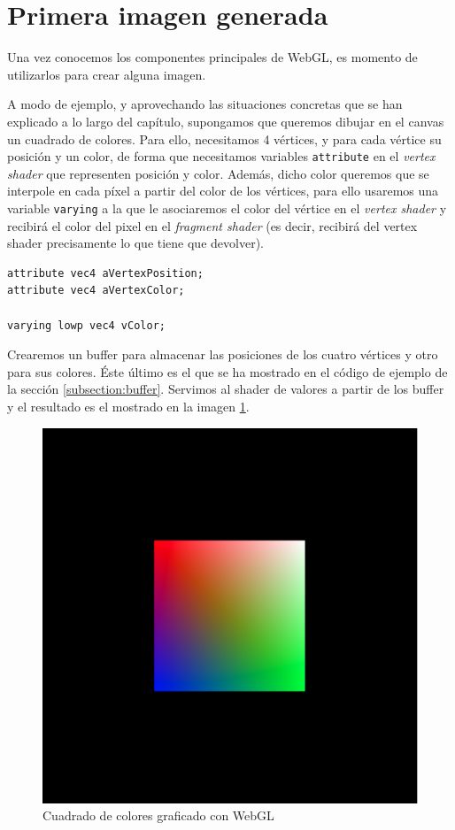 \section{Primera imagen generada}

Una vez conocemos los componentes principales de WebGL, es momento de utilizarlos para crear alguna imagen.

A modo de ejemplo, y aprovechando las situaciones concretas que se han explicado a lo largo del capítulo, supongamos que queremos dibujar en el canvas un cuadrado de colores. Para ello, necesitamos 4 vértices, y para cada vértice su posición y un color, de forma que necesitamos variables \verb|attribute| en el \textit{vertex shader} que representen posición y color. Además, dicho color queremos que se interpole en cada píxel a partir del color de los vértices, para ello usaremos una variable \verb|varying| a la que le asociaremos el color del vértice en el \textit{vertex shader} y recibirá el color del pixel en el \textit{fragment shader} (es decir, recibirá del vertex shader precisamente lo que tiene que devolver).
\begin{lstlisting}
attribute vec4 aVertexPosition;
attribute vec4 aVertexColor;

varying lowp vec4 vColor;
\end{lstlisting}

Crearemos un buffer para almacenar las posiciones de los cuatro vértices y otro para sus colores. Éste último es el que se ha mostrado en el código de ejemplo de la sección \ref{subsection:buffer}. Servimos al shader de valores a partir de los buffer y el resultado es el mostrado en la imagen \ref{fig:ejemplo-wgl}.

\begin{figure} [ht]
    \centering
    \includegraphics[scale = 0.4]{img/C5/ejemplo-shaders.png}
    \caption{Cuadrado de colores graficado con WebGL}
    \label{fig:ejemplo-wgl}
\end{figure}

